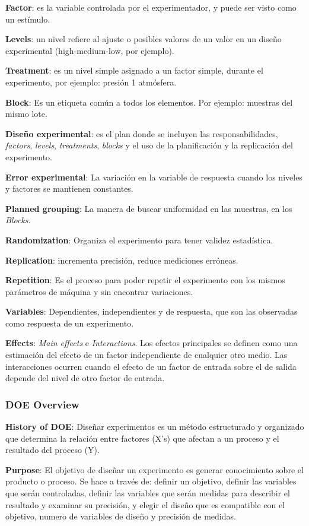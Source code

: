 \documentclass[]{article}
\begin{document}
\textbf{Factor}: es la variable controlada por el experimentador, y puede ser visto como un estímulo.

\textbf{Levels}: un nivel refiere al ajuste o posibles valores de un valor en un diseño experimental (high-medium-low, por ejemplo).

\textbf{Treatment}: es un nivel simple asignado a un factor simple, durante el experimento, por ejemplo: presión 1 atmósfera.

\textbf{Block}: Es un etiqueta común a todos los elementos. Por ejemplo: muestras del mismo lote.

\textbf{Diseño experimental}: es el plan donde se incluyen las responsabilidades, \textit{factors}, \textit{levels}, \textit{treatments}, \textit{blocks} y el uso de la planificación y la replicación del experimento.

\textbf{Error experimental}: La variación en la variable de respuesta cuando los niveles y factores se mantienen constantes.

\textbf{Planned grouping}: La manera de buscar uniformidad en las muestras, en los \textit{Blocks}.

\textbf{Randomization}: Organiza el experimento para tener validez estadística.

\textbf{Replication}: incrementa precisión, reduce mediciones erróneas.

\textbf{Repetition}: Es el proceso para poder repetir el experimento con los mismos parámetros de máquina y sin encontrar variaciones.

\textbf{Variables}: Dependientes, independientes y de respuesta, que son las observadas como respuesta de un experimento.

\textbf{Effects}: \textit{Main effects} e \textit{Interactions}. Los efectos principales se definen como una estimación del efecto de un factor independiente de cualquier otro medio. Las interacciones ocurren cuando el efecto de un factor de entrada sobre el de salida depende del nivel de otro factor de entrada.

\subsubsection{DOE Overview}

\textbf{History of DOE}: Diseñar experimentos es un método estructurado y organizado que determina la relación entre factores (X's) que afectan a un proceso y el resultado del proceso (Y).

\textbf{Purpose}: El objetivo de diseñar un experimento es generar conocimiento sobre el producto o proceso. Se hace a través de: definir un objetivo, definir las variables que serán controladas, definir las variables que serán medidas para describir el resultado y examinar su precisión, y elegir el diseño que es compatible con el objetivo, numero de variables de diseño y precisión de medidas.
\end{document}
